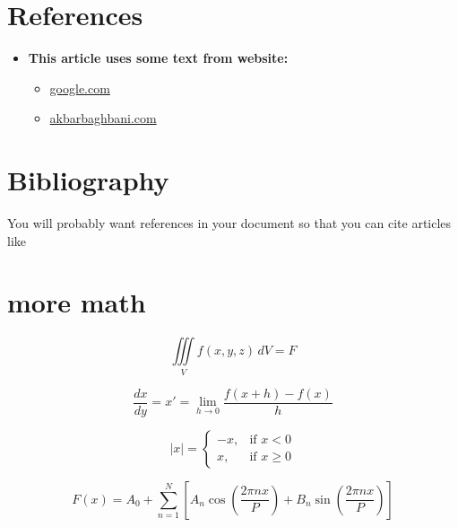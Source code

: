 \documentclass{article} %
\begin{document}
\section{References}

\begin{itemize}
\item \textbf{This article uses some text from website:}
\begin{itemize}
    \setlength{\itemsep}{10pt} %
    \item \href{https://www.google.com/}{google.com}
    \item \href{https://www.akbarbaghbani.com}{akbarbaghbani.com}
\end{itemize}
\end{itemize}

\section{Bibliography}
You will probably want references in your document so that you can cite articles like \cite{Birdetal2001, soleymaniMLCourse}

\nocite{*}




\section{more math}
\begin{equation}
    \iiint\limits_V f(x,y,z)\,dV = F
    \end{equation}
    
    
    \begin{equation}
    \frac{dx}{dy}=x'=\lim_{h \to 0}\frac{f(x+h)-f(x)}{h}
    \end{equation}
    
    
    \begin{equation}
    |x|=\begin{cases}
    -x, & \text{if $x < 0$}\\
    x, & \text{if $x \geq 0$} 
    \end{cases}
    \end{equation}
    
    
    \begin{equation}
    F(x)= A_0 + \sum_{n=1}^N\left[ A_n\cos{\left(\frac{2\pi nx}{P}\right)}+B_n\sin{\left(\frac{2\pi nx}{P}\right)}\right]
    \end{equation}
    
\end{document}
